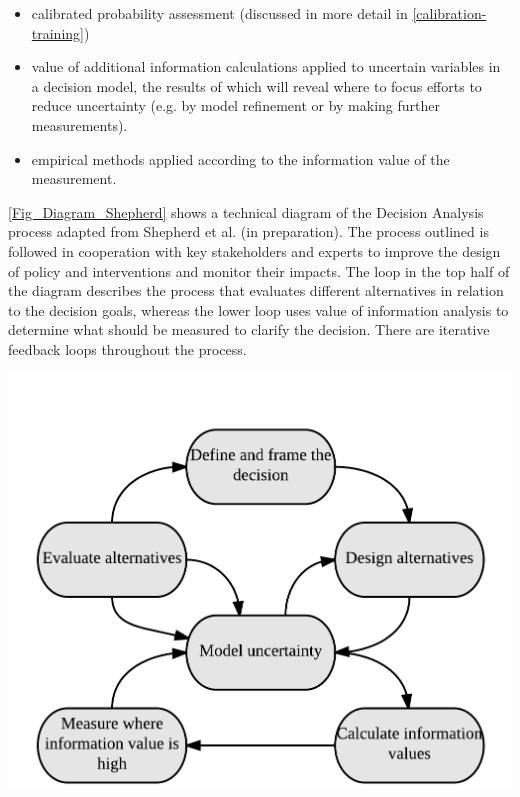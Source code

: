 \documentclass[
]{article}
\let\origfigure\figure
\let\endorigfigure\endfigure
\renewenvironment{figure}[1][2] {
    \expandafter\origfigure\expandafter[H]
} {
    \endorigfigure
}
\begin{document}
\begin{itemize}
  \item calibrated probability assessment (discussed in more detail in \autoref{calibration-training}) 
  \item value of additional information calculations applied to uncertain variables in a decision model, the results of which will reveal where to focus efforts to reduce uncertainty (e.g. by model refinement or by making further measurements).
  \item empirical methods applied according to the information value of the measurement. 
\end{itemize}

\autoref{Fig_Diagram_Shepherd} shows a technical diagram of the Decision
Analysis process adapted from Shepherd et al. (in preparation). The
process outlined is followed in cooperation with key stakeholders and
experts to improve the design of policy and interventions and monitor
their impacts. The loop in the top half of the diagram describes the
process that evaluates different alternatives in relation to the
decision goals, whereas the lower loop uses value of information
analysis to determine what should be measured to clarify the decision.
There are iterative feedback loops throughout the process.

\begin{figure}
\centering
\includegraphics{Fig_Diagram_Shepherd.png}
\caption{Summary of the decision modeling proces; the sequence of
activities in the decision modeling approach (adapted from Shepherd et
al.~in preperation).\label{Fig_Diagram_Shepherd}}
\end{figure}
\end{document}
